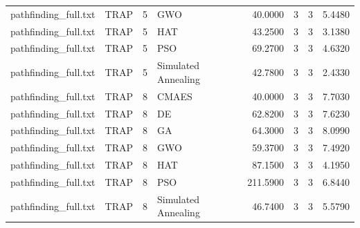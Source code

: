 \begin{tabular}{llrlrrrr}
pathfinding_full.txt & TRAP & 5 & GWO & 40.0000 & 3 & 3 & 5.4480 \\
pathfinding_full.txt & TRAP & 5 & HAT & 43.2500 & 3 & 3 & 3.1380 \\
pathfinding_full.txt & TRAP & 5 & PSO & 69.2700 & 3 & 3 & 4.6320 \\
pathfinding_full.txt & TRAP & 5 & Simulated Annealing & 42.7800 & 3 & 3 & 2.4330 \\
pathfinding_full.txt & TRAP & 8 & CMAES & 40.0000 & 3 & 3 & 7.7030 \\
pathfinding_full.txt & TRAP & 8 & DE & 62.8200 & 3 & 3 & 7.6230 \\
pathfinding_full.txt & TRAP & 8 & GA & 64.3000 & 3 & 3 & 8.0990 \\
pathfinding_full.txt & TRAP & 8 & GWO & 59.3700 & 3 & 3 & 7.4920 \\
pathfinding_full.txt & TRAP & 8 & HAT & 87.1500 & 3 & 3 & 4.1950 \\
pathfinding_full.txt & TRAP & 8 & PSO & 211.5900 & 3 & 3 & 6.8440 \\
pathfinding_full.txt & TRAP & 8 & Simulated Annealing & 46.7400 & 3 & 3 & 5.5790 \\
\bottomrule
\end{tabular}
